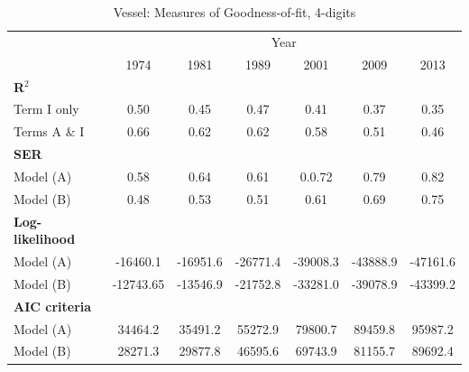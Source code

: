\documentclass[a4paper,11pt]{article}
\begin{document}
\begin{table}[htbp]
  \centering
  \caption{Vessel: Measures of Goodness-of-fit, 4-digits}
\begin{center}
\label{tab:good_fit_ves_rob}%
  \footnotesize{
\begin{tabular}{l|cccccc}
\hline
\hline
      & \multicolumn{6}{c}{Year}                   \\
      & \multicolumn{1}{c}{1974} & \multicolumn{1}{c}{1981} & \multicolumn{1}{c}{1989} & \multicolumn{1}{c}{2001} & \multicolumn{1}{c}{2009} & \multicolumn{1}{c}{2013}  \\ \hline
\boldmath{}\textbf{R$^{2}$}\unboldmath{} &       &       &       &       &       &         \\
Term I only & 0.50  & 0.45  & \multicolumn{1}{c}{0.47} & \multicolumn{1}{c}{0.41} & \multicolumn{1}{c}{0.37} & \multicolumn{1}{c}{0.35} \\
Terms A \& I & 0.66  & 0.62  & \multicolumn{1}{c}{0.62} & \multicolumn{1}{c}{0.58} & \multicolumn{1}{c}{0.51} & \multicolumn{1}{c}{0.46} \\
\textbf{SER} &       &       & \multicolumn{1}{c}{} & \multicolumn{1}{c}{} & \multicolumn{1}{c}{} & \multicolumn{1}{c}{} \\
Model (A) &    0.58   &   0.64    & \multicolumn{1}{c}{0.61} & \multicolumn{1}{c}{0.0.72} & \multicolumn{1}{c}{0.79} & \multicolumn{1}{c}{0.82} \\
Model (B) &   0.48    &    0.53   & \multicolumn{1}{c}{0.51} & \multicolumn{1}{c}{0.61} & \multicolumn{1}{c}{0.69} & \multicolumn{1}{c}{0.75} \\
\textbf{Log-likelihood} &       &       & \multicolumn{1}{c}{} & \multicolumn{1}{c}{} & \multicolumn{1}{c}{} & \multicolumn{1}{c}{} \\
Model (A)& -16460.1 & -16951.6 & \multicolumn{1}{c}{-26771.4} & \multicolumn{1}{c}{-39008.3} & \multicolumn{1}{c}{-43888.9} & \multicolumn{1}{c}{-47161.6} \\
Model (B) & -12743.65 & -13546.9 & \multicolumn{1}{c}{-21752.8} & \multicolumn{1}{c}{-33281.0} & \multicolumn{1}{c}{-39078.9} & \multicolumn{1}{c}{-43399.2}  \\
\textbf{AIC criteria} &       &       & \multicolumn{1}{c}{} & \multicolumn{1}{c}{} & \multicolumn{1}{c}{} & \multicolumn{1}{c}{} \\
Model (A) & 34464.2 & 35491.2 & \multicolumn{1}{c}{55272.9} & \multicolumn{1}{c}{79800.7} & \multicolumn{1}{c}{89459.8} & \multicolumn{1}{c}{95987.2}\\
Model (B) & 28271.3 & 29877.8 & \multicolumn{1}{c}{46595.6} & \multicolumn{1}{c}{69743.9} & \multicolumn{1}{c}{81155.7} & \multicolumn{1}{c}{89692.4} \\

\end{tabular}}
\end{center}
\end{table}
\end{document}
